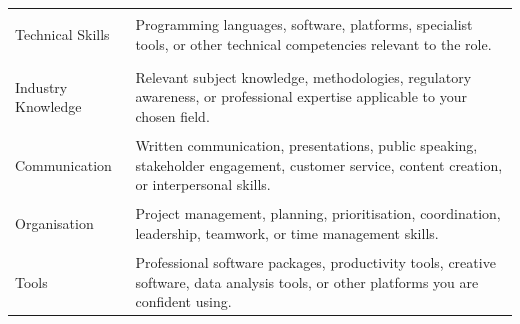 \documentclass[12pt,a4paper]{report}
\begin{document}
\begin{tabular}{
>{\bfseries\raggedright\arraybackslash}p{4cm}
>{\raggedright\arraybackslash}p{\dimexpr\linewidth-4cm-2\tabcolsep\relax}
}

Technical Skills &
Programming languages, software, platforms, specialist tools, or
other technical competencies relevant to the role. \\

Industry Knowledge &
Relevant subject knowledge, methodologies, regulatory awareness,
or professional expertise applicable to your chosen field. \\

Communication &
Written communication, presentations, public speaking, stakeholder
engagement, customer service, content creation, or interpersonal skills. \\

Organisation &
Project management, planning, prioritisation, coordination,
leadership, teamwork, or time management skills. \\

Tools &
Professional software packages, productivity tools, creative software,
data analysis tools, or other platforms you are confident using. \\

\end{tabular}
\end{document}

